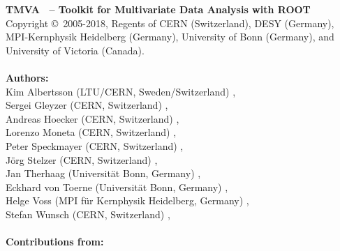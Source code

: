 \begin{center}
{\small\sf
{\sf\bfseries TMVA \TMVAVersion\ -- Toolkit for Multivariate Data Analysis with ROOT}  \\
Copyright 
\copyright\  2005-2018, Regents of 
CERN (Switzerland),  
DESY (Germany),
MPI-Kernphysik Heidelberg (Germany),
University of Bonn (Germany),
and University of Victoria (Canada). \\

\hspace{0.5cm} \\
{\sf\bfseries Authors:} \\

Kim Albertsson (LTU/CERN, Sweden/Switzerland) ,\\
Sergei Gleyzer (CERN, Switzerland) , \\
Andreas Hoecker (CERN, Switzerland) , \\
Lorenzo Moneta (CERN, Switzerland) , \\
Peter Speckmayer (CERN, Switzerland) , \\
J\"org Stelzer (CERN, Switzerland) ,\\
Jan Therhaag (Universit\"at Bonn, Germany) , \\
Eckhard von Toerne (Universit\"at Bonn, Germany) ,\\
Helge Voss (MPI f\"ur Kernphysik Heidelberg, Germany) ,\\
Stefan Wunsch (CERN, Switzerland) , \\

\hspace{0.5cm} \\
{\sf\bfseries Contributions from:} \\

}
\end{center}
